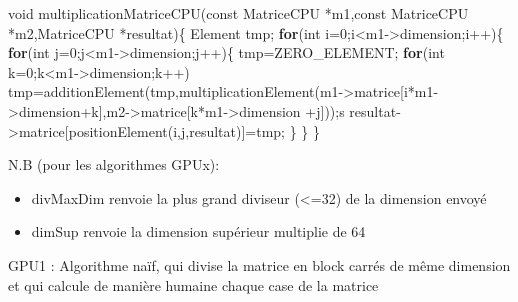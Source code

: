 \documentclass[]{article}
\newenvironment{Shaded}{\begin{snugshade}}{\end{snugshade}}
\newcommand{\KeywordTok}[1]{\textcolor[rgb]{0.13,0.29,0.53}{\textbf{{#1}}}}
\newcommand{\DataTypeTok}[1]{\textcolor[rgb]{0.13,0.29,0.53}{{#1}}}
\newcommand{\DecValTok}[1]{\textcolor[rgb]{0.00,0.00,0.81}{{#1}}}
\newcommand{\NormalTok}[1]{{#1}}
\providecommand{\tightlist}{%
  \setlength{\itemsep}{0pt}\setlength{\parskip}{0pt}}
\begin{document}
\begin{Shaded}
\begin{Highlighting}[]
\DataTypeTok{void} \NormalTok{multiplicationMatriceCPU(}\DataTypeTok{const} \NormalTok{MatriceCPU *m1,}\DataTypeTok{const} \NormalTok{MatriceCPU *m2,MatriceCPU *resultat)\{}
    \NormalTok{Element tmp;}
    \KeywordTok{for}\NormalTok{(}\DataTypeTok{int} \NormalTok{i=}\DecValTok{0}\NormalTok{;i<m1->dimension;i++)\{}
        \KeywordTok{for}\NormalTok{(}\DataTypeTok{int} \NormalTok{j=}\DecValTok{0}\NormalTok{;j<m1->dimension;j++)\{}
            \NormalTok{tmp=ZERO_ELEMENT;}
            \KeywordTok{for}\NormalTok{(}\DataTypeTok{int} \NormalTok{k=}\DecValTok{0}\NormalTok{;k<m1->dimension;k++)}
                \NormalTok{tmp=additionElement(tmp,multiplicationElement(m1->matrice[i*m1->dimension+k],m2->matrice[k*m1->dimension +j]));s}
            \NormalTok{resultat->matrice[positionElement(i,j,resultat)]=tmp;}
        \NormalTok{\}}
    \NormalTok{\}}
\NormalTok{\}}
\end{Highlighting}
\end{Shaded}

N.B (pour les algorithmes GPUx):

\begin{itemize}
\tightlist
\item
  divMaxDim renvoie la plus grand diviseur (\textless{}=32) de la
  dimension envoyé
\item
  dimSup renvoie la dimension supérieur multiplie de 64
\end{itemize}

GPU1 : Algorithme naïf, qui divise la matrice en block carrés de même
dimension et qui calcule de manière humaine chaque case de la matrice
\end{document}
